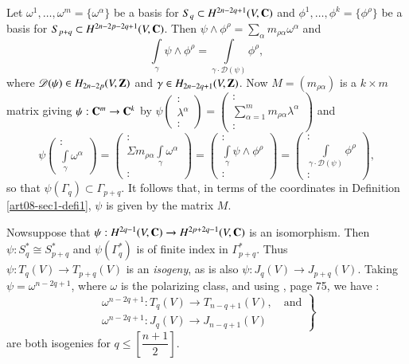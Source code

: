 Let $\omega^{1},\ldots,\omega^{m}=\{\omega^{\alpha}\}$ be a basis for $S_{q}\subset H^{2n-2q+1}(V,\mathbf{C})$ and $\phi^{1},\ldots,\phi^{k}=\{\phi^{\rho}\}$ be a basis for $S_{p+q}\subset H^{2n-2p-2q+1}(V,\mathbf{C})$. Then $\psi\wedge \phi^{\rho}=\sum\limits_{\alpha}m_{\rho\alpha}\omega^{\alpha}$ and 
\begin{equation*}
\int\limits_{\gamma}\psi \wedge \phi^{\rho}=\int\limits_{\gamma\cdot \mathscr{D}(\psi)}\phi^{\rho},\tag{2.8}\label{art08-sec2-eq2.8}
\end{equation*}
where $\mathscr{D}(\psi)\in H_{2n-2p}(V,\mathbf{Z})$ and $\gamma\in H_{2n-2q+1}(V,\mathbf{Z})$. Now $M=(m_{\rho\alpha})$ is a $k\times m$ matrix giving $\psi:\mathbf{C}^{m}\to \mathbf{C}^{k}$ by $\psi \left(\begin{smallmatrix} :\\ \lambda^{\alpha} \\ :\end{smallmatrix}\right)=\left(\begin{smallmatrix} :\\ \sum\limits^{m}_{\alpha=1} m_{\rho\alpha}\lambda^{\alpha}\\ :\end{smallmatrix}\right)$
 and
$$
\psi\left(\begin{matrix} 
:\\ \int\limits_{\gamma}\omega^{\alpha}
\end{matrix}\right)
=
\left(\begin{matrix}
:\\
\Sigma m_{\rho\alpha}\int\limits_{\gamma}\omega^{\alpha}\\
:
\end{matrix}\right)
=
\left(\begin{matrix}
:\\
\int\limits_{\gamma}\psi \wedge \phi^{\rho}\\
:
\end{matrix}\right)
=
\left(\begin{matrix}
:\\
\int\limits_{\gamma\cdot \mathscr{D}(\psi)} \phi^{\rho}\\
:
\end{matrix}\right),
$$
so that $\psi(\Gamma_{q})\subset \Gamma_{p+q}$. It follows that, in terms of the coordinates in Definition \ref{art08-sec1-defi1}, $\psi$ is given by the matrix $M$.

Now\pageoriginale suppose that $\psi:H^{2q-1}(V,\mathbf{C})\to H^{2p+2q-1}(V,\mathbf{C})$ is an isomorphism. Then $\psi:S^{*}_{q}\cong S^{*}_{p+q}$ and $\psi(\Gamma^{*}_{q})$ is of finite index in $\Gamma^{*}_{p+q}$. Thus $\psi:T_{q}(V)\to T_{p+q}(V)$ is an {\em isogeny}, as is also $\psi:J_{q}(V)\to J_{p+q}(V)$. Taking $\psi=\omega^{n-2q+1}$, where $\omega$ is the polarizing class, and using \cite{art08-key23}, page 75, we have :
\begin{equation*}
\left.
\begin{array}{c}
\omega^{n-2q+1}:T_{q}(V)\to T_{n-q+1}(V),\text{~~ and}\\[3pt]
\omega^{n-2q+1} : J_{q}(V)\to J_{n-q+1}(V)
\end{array}\right\}\tag{2.9}\label{art08-sec2-eq2.9}
\end{equation*}
are both isogenies for $q\leq \left[\dfrac{n+1}{2}\right]$.

